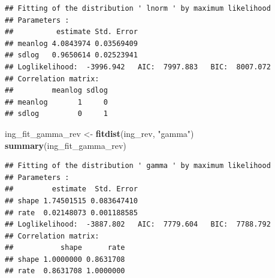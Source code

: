 \documentclass[
]{article}
\newenvironment{Shaded}{\begin{snugshade}}{\end{snugshade}}
\newcommand{\AttributeTok}[1]{\textcolor[rgb]{0.13,0.29,0.53}{#1}}
\newcommand{\ControlFlowTok}[1]{\textcolor[rgb]{0.13,0.29,0.53}{\textbf{#1}}}
\newcommand{\FloatTok}[1]{\textcolor[rgb]{0.00,0.00,0.81}{#1}}
\newcommand{\FunctionTok}[1]{\textcolor[rgb]{0.13,0.29,0.53}{\textbf{#1}}}
\newcommand{\NormalTok}[1]{#1}
\newcommand{\OtherTok}[1]{\textcolor[rgb]{0.56,0.35,0.01}{#1}}
\newcommand{\SpecialCharTok}[1]{\textcolor[rgb]{0.81,0.36,0.00}{\textbf{#1}}}
\newcommand{\StringTok}[1]{\textcolor[rgb]{0.31,0.60,0.02}{#1}}
\begin{document}
\begin{verbatim}
## Fitting of the distribution ' lnorm ' by maximum likelihood 
## Parameters : 
##          estimate Std. Error
## meanlog 4.0843974 0.03569409
## sdlog   0.9650614 0.02523941
## Loglikelihood:  -3996.942   AIC:  7997.883   BIC:  8007.072 
## Correlation matrix:
##         meanlog sdlog
## meanlog       1     0
## sdlog         0     1
\end{verbatim}

\begin{Shaded}
\end{Shaded}

\begin{Shaded}
\begin{Highlighting}[]
\NormalTok{ing\_fit\_gamma\_rev }\OtherTok{\textless{}{-}} \FunctionTok{fitdist}\NormalTok{(ing\_rev, }\StringTok{"gamma"}\NormalTok{)}
\FunctionTok{summary}\NormalTok{(ing\_fit\_gamma\_rev)}
\end{Highlighting}
\end{Shaded}

\begin{verbatim}
## Fitting of the distribution ' gamma ' by maximum likelihood 
## Parameters : 
##         estimate  Std. Error
## shape 1.74501515 0.083647410
## rate  0.02148073 0.001188585
## Loglikelihood:  -3887.802   AIC:  7779.604   BIC:  7788.792 
## Correlation matrix:
##           shape      rate
## shape 1.0000000 0.8631708
## rate  0.8631708 1.0000000
\end{verbatim}

\begin{Shaded}
\end{Shaded}
\end{document}
